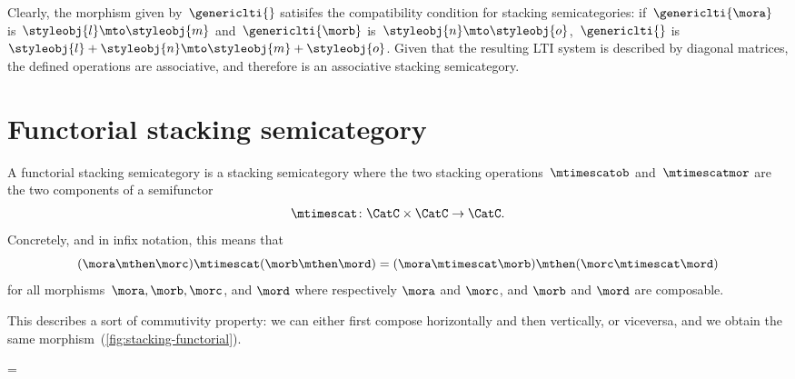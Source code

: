 Clearly, the morphism given by~$\genericlti{}$ satisifes the compatibility condition for stacking semicategories:
if~$\genericlti{\mora}$ is~$\styleobj{l}\mto \styleobj{m}$ and~$\genericlti{\morb}$ is~$\styleobj{n}\mto \styleobj{o}$,~$\genericlti{}$ is~$\styleobj{l}+\styleobj{n}\mto \styleobj{m}+\styleobj{o}$.
Given that the resulting LTI system is described by diagonal matrices, the defined operations are associative, and therefore \LTI is an associative stacking semicategory.

\section{Functorial stacking semicategory}

\begin{ctdefinition}
    \label{def:functorial-stacking-semi-cat}
    A functorial stacking semicategory is a stacking semicategory where the two stacking operations~$\mtimescatob$ and~$\mtimescatmor$ are the two components of a semifunctor
    \begin{equation}
        \mtimescat\colon \CatC \times \CatC \to \CatC.
    \end{equation}
    Concretely, and in infix notation, this means that
    \begin{equation}
        (\mora \mthen \morc ) \mtimescat (\morb \mthen \mord )
        =
        (\mora \mtimescat \morb )
        \mthen (\morc \mtimescat \mord )
    \end{equation}
    for all morphisms~$\mora, \morb, \morc$, and $\mord$ where respectively $\mora$ and $\morc$, and $\morb$ and $\mord$ are composable.
\end{ctdefinition}

%
This describes a sort of commutivity property: we can either first compose horizontally and then vertically, or viceversa, and we obtain the same morphism~(\cref{fig:stacking-functorial}).

\begin{figure*}[h]
    \centering
    =
    \caption{Commutation of stacking and composition in a functorial stacking semicategory. }
    \label{fig:stacking-functorial}
\end{figure*}

